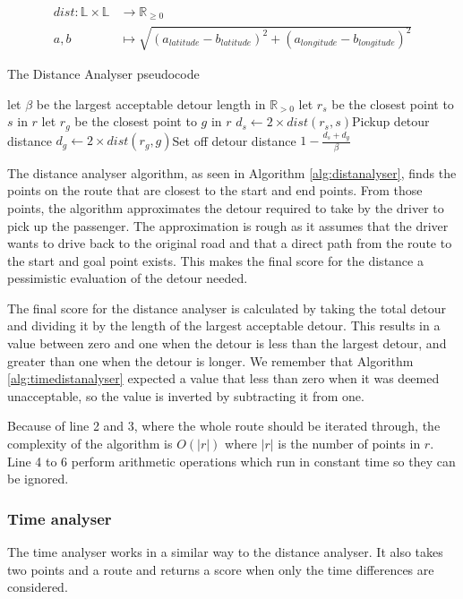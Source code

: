 \begin{align*}
	dist : \mathbb{L}\times\mathbb{L} &\rightarrow \mathbb{R}_{\geq 0}\\
	a, b &\mapsto \sqrt{(a_{latitude} - b_{latitude})^2 + (a_{longitude} - b_{longitude})^2}
\end{align*}

\begin{algorithm}
	\caption{The Distance Analyser pseudocode}
	\label{alg:distanalyser}
	\begin{algorithmic}[1]
		\Require 
		\Statex let $\beta$ be the largest acceptable detour length in $\mathbb{R}_{>0}$ 
		\Statex 
			\State let $r_s$ be the closest point to $s$ in $r$
			\State let $r_g$ be the closest point to $g$ in $r$
			\State $d_s\gets 2\times dist(r_s, s)$\Comment Pickup detour distance
			\State $d_g\gets 2\times dist(r_g, g)$\Comment Set off detour distance
			\State\Return $1-\frac{d_s + d_g}{\beta}$
		\EndFunction
	\end{algorithmic}
\end{algorithm}

The distance analyser algorithm, as seen in Algorithm \ref{alg:distanalyser}, finds the points on the route that are closest to the start and end points.
From those points, the algorithm approximates the detour required to take by the driver to pick up the passenger.
The approximation is rough as it assumes that the driver wants to drive back to the original road and that a direct path from the route to the start and goal point exists.
This makes the final score for the distance a pessimistic evaluation  of the detour needed.

The final score for the distance analyser is calculated by taking the total detour and dividing it by the length of the largest acceptable detour.
This results in a value between zero and one when the detour is less than the largest detour, and greater than one when the detour is longer.
We remember that Algorithm \ref{alg:timedistanalyser} expected a value that less than zero when it was deemed unacceptable, so the value is inverted by subtracting it from one.

Because of line 2 and 3, where the whole route should be iterated through, the complexity of the algorithm is $O(|r|)$ where $|r|$ is the number of points in $r$.
Line 4 to 6 perform arithmetic operations which run in constant time so they can be ignored.

\subsubsection{Time analyser}
The time analyser works in a similar way to the distance analyser. 
It also takes two points and a route and returns a score when only the time differences are considered.

